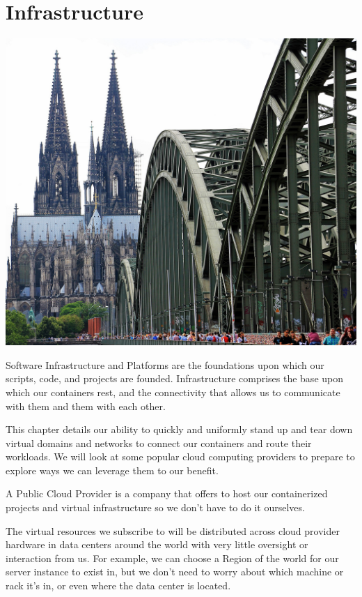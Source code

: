 \chapter{Infrastructure}

\justify{}
\includegraphics{images/cologne-cathedral-1507854_1920.jpg}

\justify{}
Software Infrastructure and Platforms are the foundations upon which our
scripts, code, and projects are founded. Infrastructure comprises the
base upon which our containers rest, and the connectivity that allows us
to communicate with them and them with each other.

\justify{}
This chapter details our ability to quickly and uniformly stand up and
tear down virtual domains and networks to connect our containers and
route their workloads. We will look at some popular cloud computing
providers to prepare to explore ways we can leverage them to our
benefit.

\justify{}
A Public Cloud Provider is a company that offers to host our containerized
projects and virtual infrastructure so we don't have to do it ourselves.

\justify{}
The virtual resources we subscribe to will be distributed across cloud
provider hardware in data centers around the world with very little
oversight or interaction from us. For example, we can choose a Region of
the world for our server instance to exist in, but we don't need to
worry about which machine or rack it's in, or even where the data center
is located.

